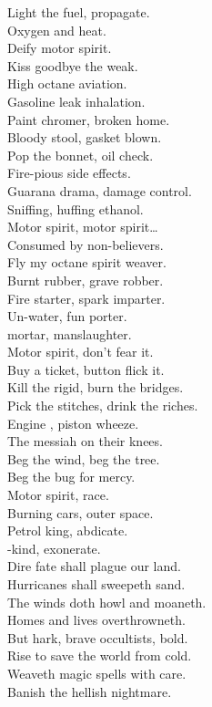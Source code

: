 Light the fuel, propagate. \\
Oxygen and heat. \\
Deify motor spirit. \\
Kiss goodbye the weak. \\

High octane aviation. \\
Gasoline leak inhalation. \\
Paint chromer, broken home. \\
Bloody stool, gasket blown. \\
Pop the bonnet, oil check. \\
Fire-pious side effects. \\
Guarana drama, damage control. \\
Sniffing, huffing ethanol. \\

Motor spirit, motor spirit… \\

Consumed by non-believers. \\
Fly my octane spirit weaver. \\

Burnt rubber, grave robber. \\
Fire starter, spark imparter. \\
Un-water, fun porter. \\
 mortar, manslaughter. \\
Motor spirit, don't fear it. \\
Buy a ticket, button flick it. \\
Kill the rigid, burn the bridges. \\
Pick the stitches, drink the riches. \\

Engine , piston wheeze. \\
The messiah on their knees. \\
Beg the wind, beg the tree. \\
Beg the bug for mercy. \\
Motor spirit,  race. \\
Burning cars, outer space. \\
Petrol king, abdicate. \\
-kind, exonerate. \\

Dire fate shall plague our land. \\
Hurricanes shall sweepeth sand. \\
The winds doth howl and moaneth. \\
Homes and lives overthrowneth. \\
But hark, brave occultists, bold. \\
Rise to save the world from cold. \\
Weaveth magic spells with care. \\
Banish the hellish nightmare. \\

